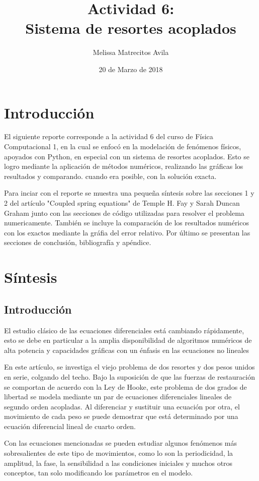 \documentclass{article}
\title{Actividad 6:\\ Sistema de resortes acoplados}
\author{Melissa Matrecitos Avila}
\date{20 de Marzo de 2018}
\begin{document}
\maketitle
\section{Introducción}
El siguiente reporte corresponde a la actividad 6 del curso de Física Computacional 1, en la cual se enfocó en la modelación de fenómenos físicos, apoyados con Python, en especial con un sistema de resortes acoplados. Esto se logro mediante la aplicación de métodos numéricos, realizando las gráficas los resultados y comparando. cuando era posible, con la solución exacta.

Para inciar con el reporte se muestra una pequeña síntesis sobre las secciones 1 y 2 del artículo "Coupled spring equations" de  Temple H. Fay y Sarah Duncan Graham junto con las secciones de código utilizadas para resolver el problema numericamente. También se incluye la comparación de los resultados numéricos con los exactos mediante la gráfia del error relativo. Por último se presentan las secciones de conclusión, bibliografía y apéndice.

\section{Síntesis}
\subsection{Introducción}
El estudio clásico de las ecuaciones diferenciales está cambiando rápidamente, esto se debe en particular a la amplia disponibilidad de algoritmos numéricos de alta potencia y capacidades gráficas con un énfasis en las ecuaciones no lineales

En este artículo, se investiga el viejo problema de dos resortes y dos pesos unidos en serie, colgando del techo. Bajo la suposición de que las fuerzas de restauración se comportan de acuerdo con la Ley de Hooke, este problema de dos grados de libertad se modela mediante un par de ecuaciones diferenciales lineales de segundo orden acopladas. Al diferenciar y sustituir una ecuación por otra, el movimiento de cada peso se puede demostrar que está determinado por una ecuación diferencial lineal de cuarto orden.

Con las ecuaciones mencionadas se pueden estudiar algunos fenómenos más sobresalientes de este tipo de movimientos, como lo son la periodicidad, la amplitud, la fase, la sensibilidad a las condiciones iniciales y muchos otros conceptos, tan solo modificando los parámetros en el modelo.
\end{document}
